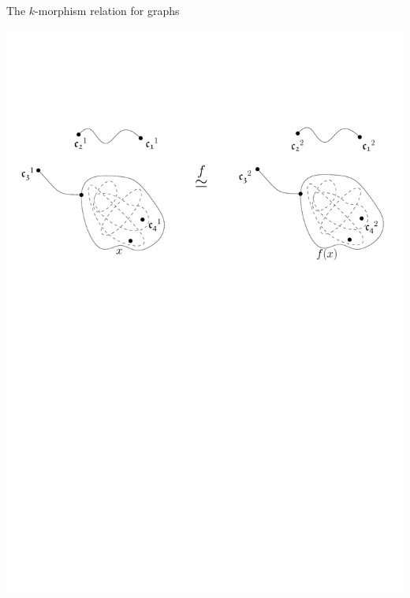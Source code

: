 \documentclass[11pt]{beamer}
\begin{document}
	\begin{frame}{The $k$-morphism relation for graphs}
	\begin{center}
		\vspace{0.58 em}
		\includegraphics[width=\linewidth]{kmorphiccenter2.pdf}
	\end{center}
	\end{frame}
\end{document}

